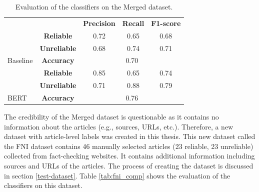 \begin{table}[H]
    \centering
\begin{tabular}{lc|c|c|c|}
\cline{3-5}
                                                                          &                     & \textbf{Precision} & \textbf{Recall} & \textbf{F1-score} \\ \cline{2-5} 
\multicolumn{1}{l|}{\cellcolor[HTML]{FFCCC9}}                             & \textbf{Reliable}   & 0.72               & 0.65            & 0.68              \\ \cline{2-5} 
\multicolumn{1}{l|}{\cellcolor[HTML]{FFCCC9}}                             & \textbf{Unreliable} & 0.68               & 0.74            & 0.71              \\ \cline{2-5} 
\multicolumn{1}{l|}{\multirow{-3}{*}{\cellcolor[HTML]{FFCCC9}Baseline}} & \textbf{Accuracy}   & \multicolumn{3}{c|}{0.70}                                \\ \hline \hline
\multicolumn{1}{l|}{\cellcolor[HTML]{DAE8FC}}                             & \textbf{Reliable}   & 0.85               & 0.65            & 0.74              \\ \cline{2-5} 
\multicolumn{1}{l|}{\cellcolor[HTML]{DAE8FC}}                             & \textbf{Unreliable} & 0.71               & 0.88            & 0.79              \\ \cline{2-5} 
\multicolumn{1}{l|}{\multirow{-3}{*}{\cellcolor[HTML]{DAE8FC}BERT}} & \textbf{Accuracy}   & \multicolumn{3}{c|}{0.76}                                \\ \cline{2-5} 
\end{tabular}
    \caption{Evaluation of the classifiers on the Merged dataset.}
    \label{tab:merged_comp}
\end{table}

The credibility of the Merged dataset is questionable as it contains no information about the articles (e.g., sources, URLs, etc.). Therefore, a new dataset with article-level labels was created in this thesis. This new dataset called the FNI dataset contains 46 manually selected articles (23 reliable, 23 unreliable) collected from fact-checking websites. It contains additional information including sources and URLs of the articles. The process of creating the dataset is discussed in section \ref{test-dataset}. Table \ref{tab:fni_comp} shows the evaluation of the classifiers on this dataset.

